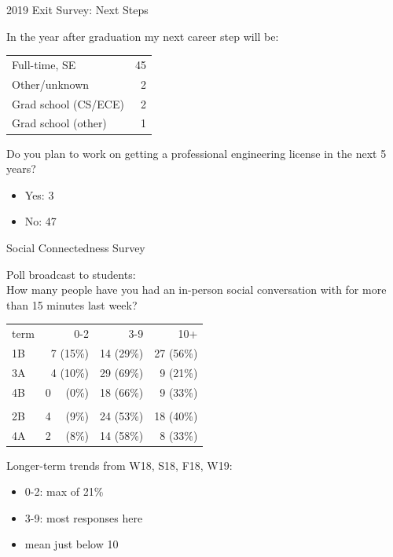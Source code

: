 \documentclass{beamer}
\newenvironment{changemargin}[1]{%
  \begin{list}{}{%
    \setlength{\topsep}{0pt}%
    \setlength{\leftmargin}{#1}%
    \setlength{\rightmargin}{1em}
    \setlength{\listparindent}{\parindent}%
    \setlength{\itemindent}{\parindent}%
    \setlength{\parsep}{\parskip}%
  }%
  \item[]}{\end{list}}
\begin{document}
\begin{frame}{2019 Exit Survey: Next Steps}
  \begin{changemargin}{1cm}
    In the year after graduation my next career step will be:\\
\begin{center}
    \begin{tabular}{lr}
  Full-time, SE & 45\\
  Other/unknown & 2\\
  Grad school (CS/ECE) & 2\\
  Grad school (other) & 1 \\
    \end{tabular}
\end{center}

    Do you plan to work on getting a professional engineering license in the next 5 years?\\
    \begin{center}
      \begin{itemize}
    \item Yes: 3
    \item No: 47
      \end{itemize}
    \end{center}
  \end{changemargin}
\end{frame}

\begin{frame}{Social Connectedness Survey}

  Poll broadcast to students:\\[1em]
  
How many people have you had an in-person social conversation with for more than 15 minutes last week?
  \begin{center}
  \begin{tabular}{lrrr}
term  &0-2        &3-9     &   10+  \\ 
1B    &7 (15\%)   &   14 (29\%) &   27 (56\%)\\
3A    &4 (10\%)   &   29 (69\%)  &  9 (21\%)\\
4B    &0 ~~(0\%)  &   18 (66\%)   & 9 (33\%)\\ \\
2B    & 4 ~~(9\%) &   24 (53\%)  & 18 (40\%) \\
4A    & 2 ~~(8\%) &   14 (58\%) &  8 (33\%) 
  \end{tabular}
  \end{center}
  Longer-term trends from W18, S18, F18, W19:
  \begin{itemize}
  \item 0-2: max of 21\%
  \item 3-9: most responses here
  \item mean just below 10
  \end{itemize}
\end{frame}
\end{document}
